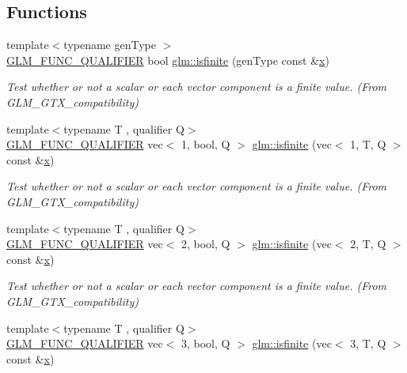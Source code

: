 \subsection*{Functions}
\begin{DoxyCompactItemize}
\item 
{\footnotesize template$<$typename gen\+Type $>$ }\\\hyperlink{setup_8hpp_a33fdea6f91c5f834105f7415e2a64407}{G\+L\+M\+\_\+\+F\+U\+N\+C\+\_\+\+Q\+U\+A\+L\+I\+F\+I\+ER} bool \hyperlink{group__gtx__compatibility_gaf4b04dcd3526996d68c1bfe17bfc8657}{glm\+::isfinite} (gen\+Type const \&\hyperlink{_s_d_l__opengl_8h_ad0e63d0edcdbd3d79554076bf309fd47}{x})
\begin{DoxyCompactList}\small\item\em Test whether or not a scalar or each vector component is a finite value. (From G\+L\+M\+\_\+\+G\+T\+X\+\_\+compatibility) \end{DoxyCompactList}\item 
{\footnotesize template$<$typename T , qualifier Q$>$ }\\\hyperlink{setup_8hpp_a33fdea6f91c5f834105f7415e2a64407}{G\+L\+M\+\_\+\+F\+U\+N\+C\+\_\+\+Q\+U\+A\+L\+I\+F\+I\+ER} vec$<$ 1, bool, Q $>$ \hyperlink{group__gtx__compatibility_gac3b12b8ac3014418fe53c299478b6603}{glm\+::isfinite} (vec$<$ 1, T, Q $>$ const \&\hyperlink{_s_d_l__opengl_8h_ad0e63d0edcdbd3d79554076bf309fd47}{x})
\begin{DoxyCompactList}\small\item\em Test whether or not a scalar or each vector component is a finite value. (From G\+L\+M\+\_\+\+G\+T\+X\+\_\+compatibility) \end{DoxyCompactList}\item 
{\footnotesize template$<$typename T , qualifier Q$>$ }\\\hyperlink{setup_8hpp_a33fdea6f91c5f834105f7415e2a64407}{G\+L\+M\+\_\+\+F\+U\+N\+C\+\_\+\+Q\+U\+A\+L\+I\+F\+I\+ER} vec$<$ 2, bool, Q $>$ \hyperlink{group__gtx__compatibility_ga8e76dc3e406ce6a4155c2b12a2e4b084}{glm\+::isfinite} (vec$<$ 2, T, Q $>$ const \&\hyperlink{_s_d_l__opengl_8h_ad0e63d0edcdbd3d79554076bf309fd47}{x})
\begin{DoxyCompactList}\small\item\em Test whether or not a scalar or each vector component is a finite value. (From G\+L\+M\+\_\+\+G\+T\+X\+\_\+compatibility) \end{DoxyCompactList}\item 
{\footnotesize template$<$typename T , qualifier Q$>$ }\\\hyperlink{setup_8hpp_a33fdea6f91c5f834105f7415e2a64407}{G\+L\+M\+\_\+\+F\+U\+N\+C\+\_\+\+Q\+U\+A\+L\+I\+F\+I\+ER} vec$<$ 3, bool, Q $>$ \hyperlink{group__gtx__compatibility_ga929ef27f896d902c1771a2e5e150fc97}{glm\+::isfinite} (vec$<$ 3, T, Q $>$ const \&\hyperlink{_s_d_l__opengl_8h_ad0e63d0edcdbd3d79554076bf309fd47}{x})

\end{DoxyCompactItemize}
